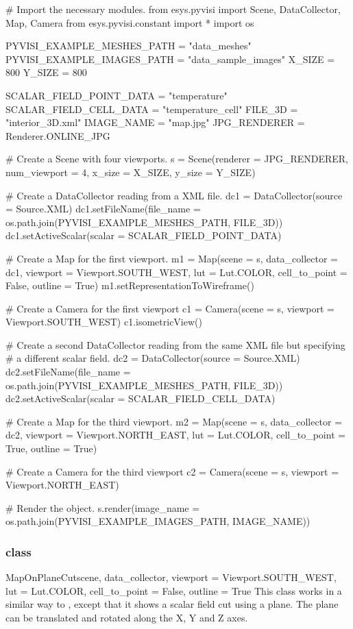 \begin{python}
# Import the necessary modules.
from esys.pyvisi import Scene, DataCollector, Map, Camera
from esys.pyvisi.constant import *
import os

PYVISI_EXAMPLE_MESHES_PATH = "data_meshes"
PYVISI_EXAMPLE_IMAGES_PATH = "data_sample_images"
X_SIZE = 800
Y_SIZE = 800

SCALAR_FIELD_POINT_DATA = "temperature"
SCALAR_FIELD_CELL_DATA = "temperature_cell"
FILE_3D = "interior_3D.xml"
IMAGE_NAME = "map.jpg"
JPG_RENDERER = Renderer.ONLINE_JPG

# Create a Scene with four viewports.
s = Scene(renderer = JPG_RENDERER, num_viewport = 4, x_size = X_SIZE, 
        y_size = Y_SIZE)

# Create a DataCollector reading from a XML file.
dc1 = DataCollector(source = Source.XML)
dc1.setFileName(file_name = os.path.join(PYVISI_EXAMPLE_MESHES_PATH, FILE_3D))
dc1.setActiveScalar(scalar = SCALAR_FIELD_POINT_DATA)

# Create a  Map for the first viewport.
m1 = Map(scene = s, data_collector = dc1, viewport = Viewport.SOUTH_WEST, 
        lut = Lut.COLOR, cell_to_point = False, outline = True)
m1.setRepresentationToWireframe()

# Create a Camera for the first viewport
c1 = Camera(scene = s, viewport = Viewport.SOUTH_WEST)
c1.isometricView()

# Create a second DataCollector reading from the same XML file but specifying
# a different scalar field.
dc2 = DataCollector(source = Source.XML)
dc2.setFileName(file_name = os.path.join(PYVISI_EXAMPLE_MESHES_PATH, FILE_3D))
dc2.setActiveScalar(scalar = SCALAR_FIELD_CELL_DATA)

# Create a Map for the third viewport.
m2 = Map(scene = s, data_collector = dc2, viewport = Viewport.NORTH_EAST, 
        lut = Lut.COLOR, cell_to_point = True, outline = True)

# Create a Camera for the third viewport
c2 = Camera(scene = s, viewport = Viewport.NORTH_EAST)

# Render the object.
s.render(image_name = os.path.join(PYVISI_EXAMPLE_IMAGES_PATH, IMAGE_NAME))
\end{python}

\subsubsection{\MapOnPlaneCut class}

\begin{classdesc}{MapOnPlaneCut}{scene, data_collector, 
viewport = Viewport.SOUTH_WEST, lut = Lut.COLOR, cell_to_point = False, 
outline = True}
This class works in a similar way to \Map, except that it shows a scalar 
field cut using a plane. The plane can be translated and rotated along the 
X, Y and Z axes.
\end{classdesc}

